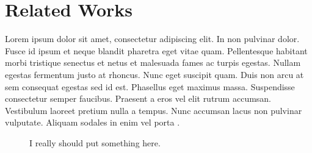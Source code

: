 \section{Related Works}\label{sec:20-theory}
Lorem ipsum dolor sit amet, consectetur adipiscing elit. In non pulvinar dolor. Fusce id ipsum et neque blandit pharetra eget vitae quam. Pellentesque habitant morbi tristique senectus et netus et malesuada fames ac turpis egestas. Nullam egestas fermentum justo at rhoncus. Nunc eget suscipit quam. Duis non arcu at sem consequat egestas sed id est. Phasellus eget maximus massa. Suspendisse consectetur semper faucibus. Praesent a eros vel elit rutrum accumsan. Vestibulum laoreet pretium nulla a tempus. Nunc accumsan lacus non pulvinar vulputate. Aliquam sodales in enim vel porta \cite{strang_2016}.

\begin{figure}[t]
	\centering
	\caption{I really should put something here.}
	\label{fig:theory_csamp_schematic}
\end{figure}%

